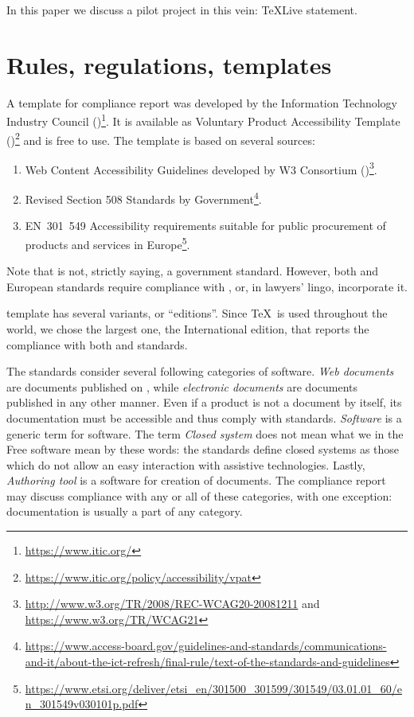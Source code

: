 \documentclass{ltugboat}
\begin{document}
In this paper we discuss a pilot project in this vein:  \TeX Live
\textsuperscript{\textregistered} statement.

\section{Rules, regulations, templates}
\label{sec:rules}

A template for compliance report was developed by the Information
Technology Industry Council
()\footnote{\url{https://www.itic.org/}}.  It is available as
Voluntary Product Accessibility Template
(\textsuperscript{\textregistered})\footnote{\url{https://www.itic.org/policy/accessibility/vpat}}
and is free to use.  The template is based on several sources:
\begin{enumerate}
\item Web Content Accessibility Guidelines developed by W3 Consortium
  ()\footnote{\url{http://www.w3.org/TR/2008/REC-WCAG20-20081211}
    and \url{https://www.w3.org/TR/WCAG21}}.
\item Revised Section 508 Standards by 
  Government\footnote{\url{https://www.access-board.gov/guidelines-and-standards/communications-and-it/about-the-ict-refresh/final-rule/text-of-the-standards-and-guidelines}}.
\item EN~301~549 Accessibility requirements suitable for public
  procurement of  products and services in
  Europe\footnote{\url{https://www.etsi.org/deliver/etsi_en/301500_301599/301549/03.01.01_60/en_301549v030101p.pdf}}.
\end{enumerate}
Note that  is not, strictly saying, a government standard.
However, both  and European standards require compliance with
, or, in lawyers' lingo, incorporate it.  

 template has several variants, or ``editions''.  Since
\TeX\ is used throughout the world, we chose the largest one, the
International edition, that reports the compliance with both 
and  standards.

The standards consider several following categories of software.
\emph{Web documents} are documents published on , while
\emph{electronic documents} are documents published in any other
manner.  Even if a product is not a document by itself, its
documentation must be accessible and thus comply with 
standards.  \emph{Software} is a generic term for software. The term
\emph{Closed system} does not mean what we in the Free software mean
by these words: the standards define closed systems as those which do
not allow an easy interaction with assistive technologies.  Lastly,
\emph{Authoring tool} is a software for creation of documents.  The
compliance report may discuss compliance with any or all of these
categories, with one exception: documentation is usually a part of any
category.
\end{document}
